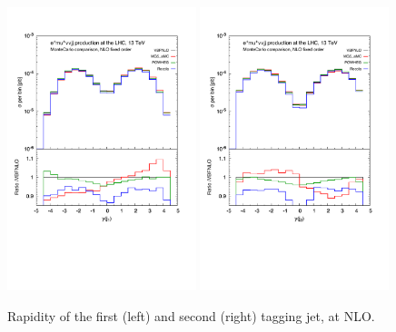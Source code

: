 \documentclass[a4paper,10pt]{report}
\begin{document}
\begin{figure}[h!]
   \centering
   \includegraphics[width=0.49\textwidth,angle=0,clip=true,trim={0.4cm 4.cm 0.6cm 1.5cm}]{figures/yj1_NLO.pdf}
   \includegraphics[width=0.49\textwidth,angle=0,clip=true,trim={0.4cm 4.cm 0.6cm 1.5cm}]{figures/yj2_NLO.pdf}
\caption{\label{fig:yj1-2NLO}Rapidity of the first (left) and second (right) tagging jet, at NLO.
}
\end{figure}
%
\end{document}
